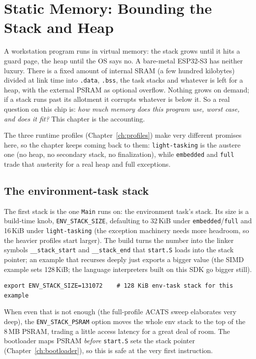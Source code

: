 \chapter{Static Memory: Bounding the Stack and Heap}
\label{ch:static-mem}

A workstation program runs in virtual memory: the stack grows until it hits a
guard page, the heap until the OS says no. A bare-metal ESP32-S3 has neither
luxury. There is a fixed amount of internal SRAM (a few hundred kilobytes)
divided at link time into \texttt{.data}, \texttt{.bss}, the task stacks and
whatever is left for a heap, with the external PSRAM as optional overflow. Nothing
grows on demand; if a stack runs past its allotment it corrupts whatever is below
it. So a real question on this chip is: \emph{how much memory does this program
use, worst case, and does it fit?} This chapter is the accounting.

The three runtime profiles (Chapter~\ref{ch:profiles}) make very different
promises here, so the chapter keeps coming back to them: \texttt{light-tasking} is
the austere one (no heap, no secondary stack, no finalization), while
\texttt{embedded} and \texttt{full} trade that austerity for a real heap and full
exceptions.

\section{The environment-task stack}

The first stack is the one \texttt{Main} runs on: the environment task's stack. Its
size is a build-time knob, \texttt{ENV\_STACK\_SIZE}, defaulting to 32\,KiB under
\texttt{embedded}/\texttt{full} and 16\,KiB under \texttt{light-tasking} (the
exception machinery needs more headroom, so the heavier profiles start larger). The
build turns the number into the linker symbols \texttt{\_\_stack\_start} and
\texttt{\_\_stack\_end} that \texttt{start.S} loads into the stack pointer; an
example that recurses deeply just exports a bigger value (the SIMD example sets
128\,KiB; the language interpreters built on this SDK go bigger still).

\begin{lstlisting}[style=sh]
export ENV_STACK_SIZE=131072    # 128 KiB env-task stack for this example
\end{lstlisting}

When even that is not enough (the full-profile ACATS sweep elaborates very deep),
the \texttt{ENV\_STACK\_PSRAM} option moves the whole env stack to the top of the
8\,MB PSRAM, trading a little access latency for a great deal of room. The
bootloader maps PSRAM \emph{before} \texttt{start.S} sets the stack pointer
(Chapter~\ref{ch:bootloader}), so this is safe at the very first instruction.

